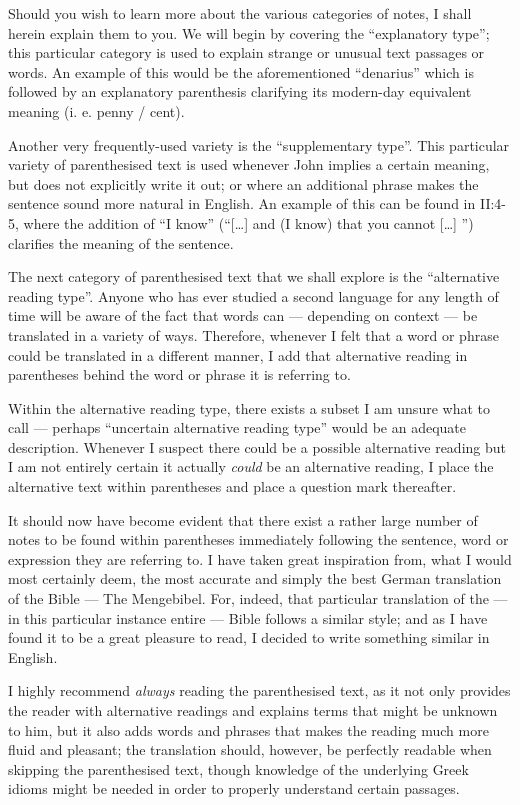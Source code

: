 Should you wish to learn more about the various categories of notes, I shall herein explain them to you. We will begin by covering the ``explanatory type''; this particular category is used to explain strange or unusual text passages or words. An example of this would be the aforementioned ``denarius'' which is followed by an explanatory parenthesis clarifying its modern-day equivalent meaning (i. e. penny / cent). 

Another very frequently-used variety is the ``supplementary type''. This particular variety of parenthesised text is used whenever John implies a certain meaning, but does not explicitly write it out; or where an additional phrase makes the sentence sound more natural in English. An example of this can be found in II:4-5, where the addition of ``I know'' (``[…] and (I know) that you cannot […] '') clarifies the meaning of the sentence. 

The next category of parenthesised text that we shall explore is the ``alternative reading type''. Anyone who has ever studied a second language for any length of time will be aware of the fact that words can — depending on context — be translated in a variety of ways. Therefore, whenever I felt that a word or phrase could be translated in a different manner, I add that alternative reading in parentheses behind the word or phrase it is referring to. 

Within the alternative reading type, there exists a subset I am unsure what to call — perhaps ``uncertain alternative reading type'' would be an adequate description. Whenever I suspect there could be a possible alternative reading but I am not entirely certain it actually \textit{could} be an alternative reading, I place the alternative text within parentheses and place a question mark thereafter. 

It should now have become evident that there exist a rather large number of notes to be found within parentheses immediately following the sentence, word or expression they are referring to. I have taken great inspiration from, what I would most certainly deem, the most accurate and simply the best German translation of the Bible — The Mengebibel. For, indeed, that particular translation of the — in this particular instance entire — Bible follows a similar style; and as I have found it to be a great pleasure to read, I decided to write something similar in English. 

I highly recommend \textit{always} reading the parenthesised text, as it not only provides the reader with alternative readings and explains terms that might be unknown to him, but it also adds words and phrases that makes the reading much more fluid and pleasant; the translation should, however, be perfectly readable when skipping the parenthesised text, though knowledge of the underlying Greek idioms might be needed in order to properly understand certain passages. 